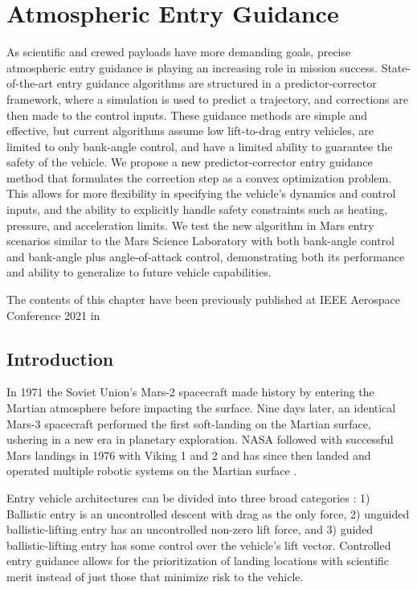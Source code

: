 \graphicspath{{cpeg1/}}


\chapter{Atmospheric Entry Guidance}
\label{sec:cpeg1}

As scientific and crewed payloads have more demanding goals, precise atmospheric entry guidance is playing an increasing role in mission success. State-of-the-art entry guidance algorithms are structured in a predictor-corrector framework, where a simulation is used to predict a trajectory, and corrections are then made to the control inputs.  These guidance methods are simple and effective, but current algorithms assume low lift-to-drag entry vehicles, are limited to only bank-angle control, and have a limited ability to guarantee the safety of the vehicle. We propose a new predictor-corrector entry guidance method that formulates the correction step as a convex optimization problem. This allows for more flexibility in specifying the vehicle's dynamics and control inputs, and the ability to explicitly handle safety constraints such as heating, pressure, and acceleration limits. We test the new algorithm in Mars entry scenarios similar to the Mars Science Laboratory with both bank-angle control and bank-angle plus angle-of-attack control, demonstrating both its performance and ability to generalize to future vehicle capabilities.

The contents of this chapter have been previously published at IEEE Aerospace Conference 2021 in \citet{tracy2022c}

\section{Introduction}
In 1971 the Soviet Union's Mars-2 spacecraft made history by entering the Martian atmosphere before impacting the surface.  Nine days later, an identical Mars-3 spacecraft performed the first soft-landing on the Martian surface, ushering in a new era in planetary exploration. NASA followed with successful Mars landings in 1976 with Viking 1 and 2 and has since then landed and operated multiple robotic systems on the Martian surface \cite{li2014}. 

Entry vehicle architectures can be divided into three broad categories \cite{li2014}: 1) Ballistic entry is an uncontrolled descent with drag as the only force, 2) unguided ballistic-lifting entry has an uncontrolled non-zero lift force, and 3) guided ballistic-lifting entry has some control over the vehicle's lift vector. Controlled entry guidance allows for the prioritization of landing locations with scientific merit instead of just those that minimize risk to the vehicle.

